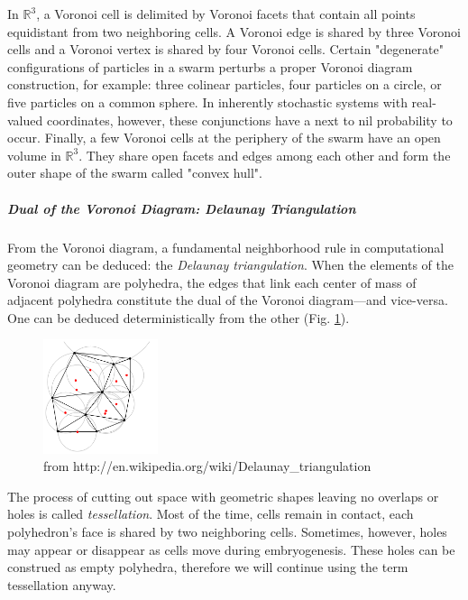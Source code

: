 In $\mathbb{R}^3$, a Voronoi cell is delimited by Voronoi facets that contain all points equidistant from two neighboring cells. A Voronoi edge is shared by three Voronoi cells and a Voronoi vertex is shared by four Voronoi cells. Certain "degenerate" configurations of particles in a swarm perturbs a proper Voronoi diagram construction, for example: three colinear particles, four particles on a circle, or five particles on a common sphere. In inherently stochastic systems with real-valued coordinates, however, these conjunctions have a next to nil probability to occur. Finally, a few Voronoi cells at the periphery of the swarm have an open volume in $\mathbb{R}^3$. They share open facets and edges among each other and form the outer shape of the swarm called "convex hull".

\subparagraph{Dual of the Voronoi Diagram: Delaunay Triangulation}


From the Voronoi diagram, a fundamental neighborhood rule in computational geometry can be deduced: the \textit{Delaunay triangulation}. When the elements of the Voronoi diagram are polyhedra, the edges that link each center of mass of adjacent polyhedra constitute the dual of the Voronoi diagram---and vice-versa. One can be deduced deterministically from the other (Fig. \ref{spatial_neighb_Delaunay_circumcircles_centers}).
\begin{figure}
\begin{center}
\includegraphics[width=0.3\textwidth]{../../images/MECAGEN/spatial_neighb/Delaunay_circumcircles_centers.png}
\end{center}
\caption{from http://en.wikipedia.org/wiki/Delaunay_triangulation}
\label{spatial_neighb_Delaunay_circumcircles_centers}
\end{figure}

The process of cutting out space with geometric shapes leaving no overlaps or holes is called \textit{tessellation}. Most of the time, cells remain in contact, each polyhedron's face is shared by two neighboring cells. Sometimes, however, holes may appear or disappear as cells move during embryogenesis. These holes can be construed as empty polyhedra, therefore we will continue using the term tessellation anyway.


